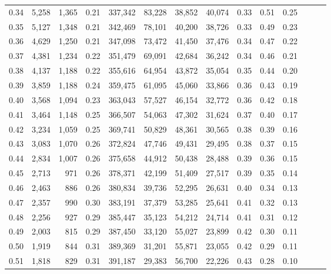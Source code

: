 \begin{tabular}{rrrrrrrrrrrrrr}
0.34 &   5,258 &  1,365 &  0.21 &  337,342 &   83,228 &  38,852 &  40,074 &  0.33 &  0.51 &      0.25 \\
0.35 &   5,127 &  1,348 &  0.21 &  342,469 &   78,101 &  40,200 &  38,726 &  0.33 &  0.49 &      0.23 \\
0.36 &   4,629 &  1,250 &  0.21 &  347,098 &   73,472 &  41,450 &  37,476 &  0.34 &  0.47 &      0.22 \\
0.37 &   4,381 &  1,234 &  0.22 &  351,479 &   69,091 &  42,684 &  36,242 &  0.34 &  0.46 &      0.21 \\
0.38 &   4,137 &  1,188 &  0.22 &  355,616 &   64,954 &  43,872 &  35,054 &  0.35 &  0.44 &      0.20 \\
0.39 &   3,859 &  1,188 &  0.24 &  359,475 &   61,095 &  45,060 &  33,866 &  0.36 &  0.43 &      0.19 \\
0.40 &   3,568 &  1,094 &  0.23 &  363,043 &   57,527 &  46,154 &  32,772 &  0.36 &  0.42 &      0.18 \\
0.41 &   3,464 &  1,148 &  0.25 &  366,507 &   54,063 &  47,302 &  31,624 &  0.37 &  0.40 &      0.17 \\
0.42 &   3,234 &  1,059 &  0.25 &  369,741 &   50,829 &  48,361 &  30,565 &  0.38 &  0.39 &      0.16 \\
0.43 &   3,083 &  1,070 &  0.26 &  372,824 &   47,746 &  49,431 &  29,495 &  0.38 &  0.37 &      0.15 \\
0.44 &   2,834 &  1,007 &  0.26 &  375,658 &   44,912 &  50,438 &  28,488 &  0.39 &  0.36 &      0.15 \\
0.45 &   2,713 &    971 &  0.26 &  378,371 &   42,199 &  51,409 &  27,517 &  0.39 &  0.35 &      0.14 \\
0.46 &   2,463 &    886 &  0.26 &  380,834 &   39,736 &  52,295 &  26,631 &  0.40 &  0.34 &      0.13 \\
0.47 &   2,357 &    990 &  0.30 &  383,191 &   37,379 &  53,285 &  25,641 &  0.41 &  0.32 &      0.13 \\
0.48 &   2,256 &    927 &  0.29 &  385,447 &   35,123 &  54,212 &  24,714 &  0.41 &  0.31 &      0.12 \\
0.49 &   2,003 &    815 &  0.29 &  387,450 &   33,120 &  55,027 &  23,899 &  0.42 &  0.30 &      0.11 \\
0.50 &   1,919 &    844 &  0.31 &  389,369 &   31,201 &  55,871 &  23,055 &  0.42 &  0.29 &      0.11 \\
0.51 &   1,818 &    829 &  0.31 &  391,187 &   29,383 &  56,700 &  22,226 &  0.43 &  0.28 &      0.10 \\

\end{tabular}
